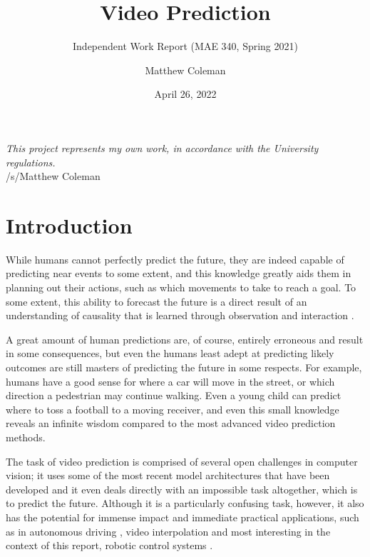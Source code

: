 \documentclass{scrartcl}
\title{Video Prediction}
\subtitle{Independent Work Report (MAE 340, Spring 2021)}
\author{Matthew Coleman}
\date{April 26, 2022}
\begin{document}
\maketitle

\vspace{8cm}
\Large
\textit{This project represents my own work, in accordance with the University regulations.} \\
\hspace*{\fill} \large /s/Matthew Coleman
\normalsize

\newpage
\tableofcontents
\newpage

\section{Introduction}
\label{sec:intro}

While humans cannot perfectly predict the future, they are indeed capable of
predicting near events to some extent, and this knowledge greatly aids them in
planning out their actions, such as which movements to take to reach a goal. To
some extent, this ability to forecast the future is a direct result of an
understanding of causality that is learned through observation and interaction
\cite{human_learning_sequences}.

A great amount of human predictions are, of course, entirely erroneous and
result in some consequences, but even the humans least adept at predicting
likely outcomes are still masters of predicting the future in some respects.
For example, humans have a good sense for where a car will move in the street,
or which direction a pedestrian may continue walking. Even a young child can
predict where to toss a football to a moving receiver, and even this small
knowledge reveals an infinite wisdom compared to the most advanced video
prediction methods.

The task of video prediction is comprised of several open challenges in
computer vision; it uses some of the most recent model architectures that have
been developed and it even deals directly with an impossible task altogether,
which is to predict the future. Although it is a particularly confusing task,
however, it also has the potential for immense impact and immediate practical
applications, such as in autonomous driving \cite{eg_self_driving}, video
interpolation \cite{eg_video_interp} and most interesting in the context of
this report, robotic control systems \cite{eg_robot_control}.

\end{document}
